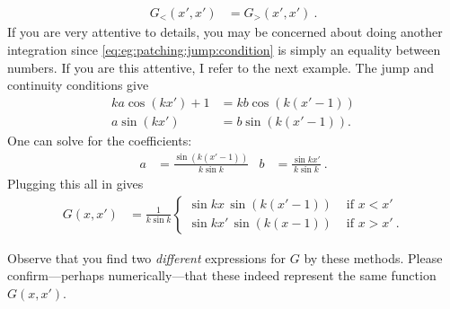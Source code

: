 \begin{example}
\begin{align}
  G_<(x',x') &= G_>(x',x') \ .
\end{align}
If you are very attentive to details, you may be concerned about doing another integration since \eqref{eq:eg:patching:jump:condition} is simply an equality between numbers. If you are this attentive, I refer to the next example.
The jump and continuity conditions give
\begin{align}
  ka \cos(kx') + 1 &= kb \cos \left(k(x'-1)\right)
  \\
  a\sin(kx') &= b\sin \left(k(x'-1)\right) .
\end{align}
One can solve for the coefficients:
\begin{align}
  a&= \frac{\sin \left(k(x'-1)\right)}{k\sin k}
  &
  b&= \frac{\sin kx'}{k\sin k} \ .
\end{align}
Plugging this all in gives 
\begin{align}
  G(x,x') &=
  \frac{1}{k\sin k}
  \begin{cases}
  \sin kx \, \sin \left(k(x'-1)\right) &\text{ if }x < x'
  \\
  \sin kx' \, \sin \left(k(x-1)\right) &\text{ if }x > x' \ .
  \end{cases}
\end{align}
\end{example}
Observe that you find two \emph{different} expressions for $G$ by these methods. Please confirm---perhaps numerically---that these indeed represent the same function $G(x,x')$. 

